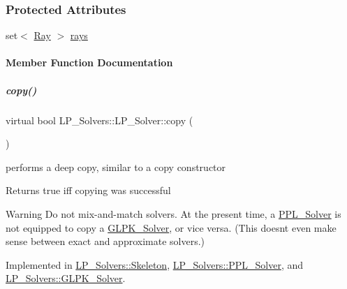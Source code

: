 \subsubsection*{Protected Attributes}
\begin{DoxyCompactItemize}
\item 
set$<$ \hyperlink{group___c_l_s_solvers_class_l_p___solvers_1_1_ray}{Ray} $>$ \hyperlink{group___c_l_s_solvers_ad4c9fb3708c156496c23515c8e841374}{rays}
\end{DoxyCompactItemize}


\paragraph{Member Function Documentation}
\mbox{\label{group___c_l_s_solvers_a36c14a88e9d3ae9d9321acc7877236d0}} 
\subparagraph{\texorpdfstring{copy()}{copy()}}
{\footnotesize\ttfamily virtual bool L\+P\+\_\+\+Solvers\+::\+L\+P\+\_\+\+Solver\+::copy (\begin{DoxyParamCaption}\item[{const \hyperlink{group___c_l_s_solvers_class_l_p___solvers_1_1_l_p___solver}{L\+P\+\_\+\+Solver} $\ast$}]{ }\end{DoxyParamCaption})\hspace{0.3cm}{\ttfamily [pure virtual]}}



performs a deep copy, similar to a copy constructor 

\begin{DoxyReturn}{Returns}
{\ttfamily true} iff copying was successful 
\end{DoxyReturn}
\begin{DoxyWarning}{Warning}
Do not mix-\/and-\/match solvers. At the present time, a \hyperlink{group___c_l_s_solvers_class_l_p___solvers_1_1_p_p_l___solver}{P\+P\+L\+\_\+\+Solver} is not equipped to copy a \hyperlink{group___c_l_s_solvers_class_l_p___solvers_1_1_g_l_p_k___solver}{G\+L\+P\+K\+\_\+\+Solver}, or vice versa. (This doesn\textquotesingle{}t even make sense between exact and approximate solvers.) 
\end{DoxyWarning}


Implemented in \hyperlink{group___c_l_s_solvers_a33b1747069c512ad69e30cb0c8786577}{L\+P\+\_\+\+Solvers\+::\+Skeleton}, \hyperlink{group___c_l_s_solvers_aa447a576420597eb9ff86b8875f5d30c}{L\+P\+\_\+\+Solvers\+::\+P\+P\+L\+\_\+\+Solver}, and \hyperlink{group___c_l_s_solvers_aafcda320ace4a6892704b46af99ce446}{L\+P\+\_\+\+Solvers\+::\+G\+L\+P\+K\+\_\+\+Solver}.

